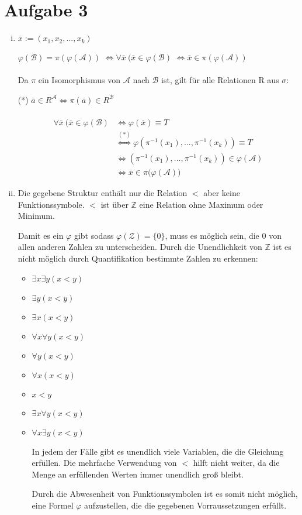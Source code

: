 \documentclass[a4paper,10pt]{article}
\begin{document}
\section*{Aufgabe 3}
\begin{enumerate}[(i)]
\item
$\overline{x} := (x_1,x_2,...,x_k)$

$\varphi(\mathcal{B}) = \pi(\varphi(\mathcal{A}))$
$\Leftrightarrow \forall \overline{x}~ (\overline{x} \in \varphi(\mathcal{B})$
$\Leftrightarrow \overline{x} \in \pi(\varphi(\mathcal{A}))$
\\
\\
Da $\pi$ ein Isomorphismus von $\mathcal{A}$ nach $\mathcal{B}$ ist, gilt für alle Relationen R aus $\sigma$: 

(*) $\overline{a} \in R^{\mathcal{A}} \Leftrightarrow \pi(\overline{a}) \in R^{\mathcal{B}}$
\\
\\
\begin{align*}
\forall \overline{x}~ \big( \overline{x} \in \varphi(\mathcal{B}) 
&\Leftrightarrow \varphi(\overline{x}) \equiv T \\
&\overset{(*)}{\Leftrightarrow} \varphi(\pi^{-1}(x_1),...,\pi^{-1}(x_k)) \equiv T \\
&\Leftrightarrow (\pi^{-1}(x_1),...,\pi^{-1}(x_k)) \in \varphi(\mathcal{A}) \\ 
&\Leftrightarrow \overline{x} \in \pi(\varphi(\mathcal{A}) \big)
\end{align*}


\item
Die gegebene Struktur enthält nur die Relation $<$ aber keine Funktionssymbole. 
$<$ ist über $\mathbb{Z}$ eine Relation ohne Maximum oder Minimum. 

Damit es ein $\varphi$ gibt sodass $\varphi(\mathcal{Z}) = \lbrace 0 \rbrace$, muss es möglich sein, die $0$ von allen anderen Zahlen zu unterscheiden. Durch die Unendlichkeit von $\mathbb{Z}$ ist es nicht möglich durch Quantifikation bestimmte Zahlen zu erkennen:
\begin{itemize}
\item
$\exists x \exists y (x < y)$
\item
$\exists y (x < y)$
\item
$\exists x (x < y)$
\item
$\forall x \forall y (x < y)$
\item
$\forall y (x < y)$
\item
$\forall x (x < y)$
\item
$x < y$
\item
$\exists x \forall y (x < y)$
\item
$\forall x \exists y (x < y)$

In jedem der Fälle gibt es unendlich viele Variablen, die die Gleichung erfüllen. Die mehrfache Verwendung von $<$ hilft nicht weiter, da die Menge an erfüllenden Werten immer unendlich groß bleibt. 

Durch die Abwesenheit von Funktionssymbolen ist es somit nicht möglich, eine Formel $\varphi$ aufzustellen, die die gegebenen Vorraussetzungen erfüllt.
\end{itemize}
\end{enumerate}
\end{document}
